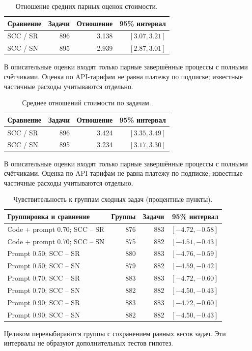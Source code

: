 \begin{table}[htbp]\centering\small
\caption{Отношение средних парных оценок стоимости.}
\label{tab:scc2000-resource-pooled}
\begin{tabular}{lrrr}\toprule
Сравнение & Задачи & Отношение & 95\% интервал\\\midrule
SCC / SR & 896 & 3.138 & $[3.07, 3.21]$\\
SCC / SN & 895 & 2.939 & $[2.87, 3.01]$\\
\bottomrule\end{tabular}
\par\smallskip\noindent В описательные оценки входят только парные завершённые процессы с полными счётчиками. Оценка по API-тарифам не равна платежу по подписке; известные частичные расходы учитываются отдельно.
\end{table}

\begin{table}[htbp]\centering\small
\caption{Среднее отношений стоимости по задачам.}
\label{tab:scc2000-resource-mean_ratio}
\begin{tabular}{lrrr}\toprule
Сравнение & Задачи & Отношение & 95\% интервал\\\midrule
SCC / SR & 896 & 3.424 & $[3.35, 3.49]$\\
SCC / SN & 895 & 3.234 & $[3.17, 3.30]$\\
\bottomrule\end{tabular}
\par\smallskip\noindent В описательные оценки входят только парные завершённые процессы с полными счётчиками. Оценка по API-тарифам не равна платежу по подписке; известные частичные расходы учитываются отдельно.
\end{table}

\begin{table}[htbp]\centering\small
\caption{Чувствительность к группам сходных задач (процентные пункты).}
\label{tab:scc2000-source}
\begin{tabular}{lrrr}\toprule
Группировка и сравнение & Группы & Задачи & 95\% интервал\\\midrule
Code + prompt 0.70; SCC -- SR & 876 & 883 & $[-4.72, -0.58]$\\
Code + prompt 0.70; SCC -- SN & 875 & 882 & $[-4.51, -0.43]$\\
Prompt 0.50; SCC -- SR & 880 & 883 & $[-4.76, -0.59]$\\
Prompt 0.50; SCC -- SN & 879 & 882 & $[-4.59, -0.42]$\\
Prompt 0.70; SCC -- SR & 883 & 883 & $[-4.72, -0.60]$\\
Prompt 0.70; SCC -- SN & 882 & 882 & $[-4.50, -0.43]$\\
Prompt 0.90; SCC -- SR & 883 & 883 & $[-4.72, -0.60]$\\
Prompt 0.90; SCC -- SN & 882 & 882 & $[-4.50, -0.43]$\\
\bottomrule\end{tabular}
\par\smallskip\noindent Целиком перевыбираются группы с сохранением равных весов задач. Эти интервалы не образуют дополнительных тестов гипотез.
\end{table}

